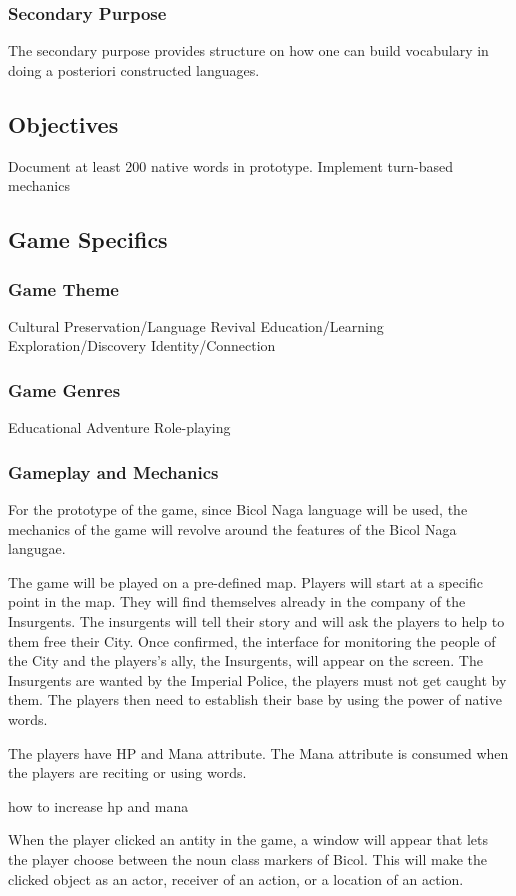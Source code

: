 \documentclass[11pt]{article}
\begin{document}
\subsubsection{Secondary Purpose}
The secondary purpose provides structure on how one can build vocabulary in doing a posteriori constructed languages.


\subsection{Objectives}
Document at least 200 native words in prototype.
Implement turn-based mechanics

\subsection{Game Specifics}
\subsubsection{Game Theme}
Cultural Preservation/Language Revival
Education/Learning
Exploration/Discovery
Identity/Connection
\subsubsection{Game Genres}
Educational
Adventure
Role-playing
\subsubsection{Gameplay and Mechanics}
For the prototype of the game, since Bicol Naga language will be used, the mechanics of the game will revolve around the features of the Bicol Naga langugae. 

The game will be played on a pre-defined map. Players will start at a specific point in the map. They will find themselves already in the company of the Insurgents. The insurgents will tell their story and will ask the players to help to them free their City. Once confirmed, the interface for monitoring the people of the City and the players's ally, the Insurgents, will appear on the screen. The Insurgents are wanted by the Imperial Police, the players must not get caught by them. The players then need to establish their base by using the power of  native words.

The players have HP and Mana attribute. The Mana attribute is consumed when the players are reciting or using words. 

how to increase hp and mana

When the player clicked an antity in the game, a window will appear that lets the player choose between the noun class markers of Bicol. This will make the clicked object as an actor, receiver of an action, or a location of an action.\\
\end{document}
